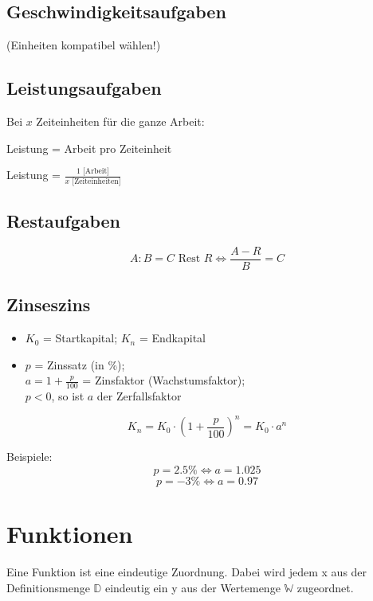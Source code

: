 \begin{multicols}{2}
\subsection*{Geschwindigkeitsaufgaben}
 (Einheiten kompatibel wählen!)

\subsection*{Leistungsaufgaben}
Bei $x$ Zeiteinheiten für die ganze Arbeit:

Leistung = Arbeit pro Zeiteinheit

Leistung = $\frac{1 \textrm{ [Arbeit]}}{x \textrm{ [Zeiteinheiten]}}$


\subsection*{Restaufgaben}
$$A:B = C \textrm{ Rest } R \Leftrightarrow{}\frac{A-R}B=C$$


\subsection*{Zinseszins}
\begin{itemize}
\item $K_0$ = Startkapital; $K_n$ = Endkapital
\item $p$ = Zinssatz (in \%);\\ $a = 1+\frac{p}{100}$ = Zinsfaktor
(Wachstumsfaktor);\\ $p<0$, so ist $a$ der Zerfallsfaktor
\end{itemize}
$$K_n = K_0 \cdot{} \left( 1+\frac{p}{100} \right)^n = K_0\cdot{}a^n$$

Beispiele:
$$p = 2.5\% \Longleftrightarrow{} a = 1.025$$
$$p = -3\% \Longleftrightarrow{}  a = 0.97 $$


\forceCB
\section*{Funktionen}

Eine Funktion ist eine {\color{red} eindeutige Zuordnung}. Dabei wird jedem {\color{ForestGreen}x} aus der {\color{ForestGreen}Definitionsmenge $\mathbb{D}$} eindeutig ein {\color{blue}y} aus der {\color{blue}Wertemenge $\mathbb{W}$} zugeordnet.


\end{multicols}
